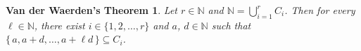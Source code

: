 \documentclass[12pt]{article}
\theoremstyle{plain}
\newtheorem*{vdw}{Van der Waerden's Theorem}
\theoremstyle{definition}
\newcommand{\bbN}{\mathbb{N}}
\begin{document}
\begin{vdw}
  Let $r \in \bbN$ and $\bbN = \bigcup_{i=1}^r C_i$.
  Then for every $\ell \in \bbN$, there exist $i \in \{1, 2, \ldots,
  r\}$ and $a$, $d \in \bbN$ such that $\{\, a, a+d, \ldots, a+\ell d
  \,\} \subseteq C_i$.
\end{vdw}

\theendnotes



\end{document}
